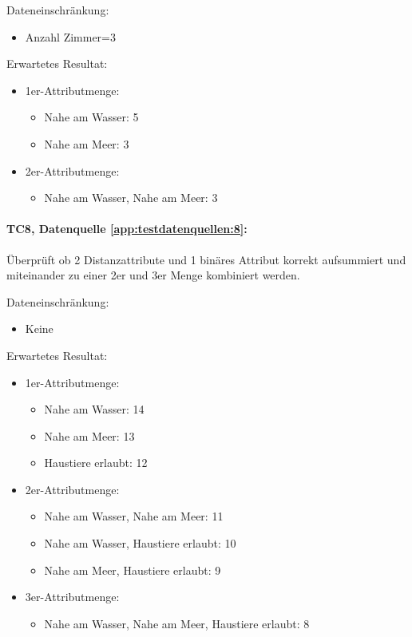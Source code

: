 Dateneinschränkung:
\begin{itemize}
	\item Anzahl Zimmer=3
\end{itemize}

Erwartetes Resultat:
\begin{itemize}
	\item 1er-Attributmenge:
	\begin{itemize}
		\item Nahe am Wasser: 5
		\item Nahe am Meer: 3
	\end{itemize}
	\item 2er-Attributmenge:
	\begin{itemize}
		\item Nahe am Wasser, Nahe am Meer: 3
	\end{itemize}
\end{itemize}

\paragraph{TC8, Datenquelle \cref{app:testdatenquellen:8}:} Überprüft ob 2 Distanzattribute und 1 binäres Attribut korrekt aufsummiert und miteinander zu einer 2er und 3er Menge kombiniert werden. 

Dateneinschränkung:
\begin{itemize}
	\item Keine
\end{itemize}

Erwartetes Resultat:
\begin{itemize}
	\item 1er-Attributmenge:
	\begin{itemize}
		\item Nahe am Wasser: 14
		\item Nahe am Meer: 13
		\item Haustiere erlaubt: 12
	\end{itemize}
	\item 2er-Attributmenge:
	\begin{itemize}
		\item Nahe am Wasser, Nahe am Meer: 11
		\item Nahe am Wasser, Haustiere erlaubt: 10
		\item Nahe am Meer, Haustiere erlaubt: 9
	\end{itemize}
	\item 3er-Attributmenge:
	\begin{itemize}
		\item Nahe am Wasser, Nahe am Meer, Haustiere erlaubt: 8
	\end{itemize}
\end{itemize}

